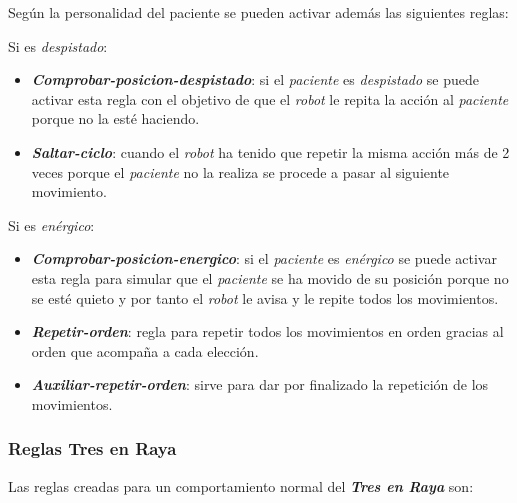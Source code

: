 \documentclass{uc3mpracticas}
\begin{document}
  Según la personalidad del paciente se pueden activar además las siguientes reglas:

  \vspace{2mm}

  Si es \textit{despistado}:

  \begin{itemize}
    \item \textbf{\textit{Comprobar-posicion-despistado}}: si el \textit{paciente} es \textit{despistado} se puede activar esta regla con el objetivo de que el \textit{robot} le repita la acción al \textit{paciente} porque no la esté haciendo.
    \item \textbf{\textit{Saltar-ciclo}}: cuando el \textit{robot} ha tenido que repetir la misma acción más de 2 veces porque el \textit{paciente} no la realiza se procede a pasar al siguiente movimiento.
  \end{itemize}


  Si es \textit{enérgico}:

  \begin{itemize}
    \item \textbf{\textit{Comprobar-posicion-energico}}: si el \textit{paciente} es \textit{enérgico} se puede activar esta regla para simular que el \textit{paciente} se ha movido de su posición porque no se esté quieto y por tanto el \textit{robot} le avisa y le repite todos los movimientos.
    \item \textbf{\textit{Repetir-orden}}: regla para repetir todos los movimientos en orden gracias al orden que acompaña a cada elección.
    \item \textbf{\textit{Auxiliar-repetir-orden}}: sirve para dar por finalizado la repetición de los movimientos.
  \end{itemize}



  \subsubsection{Reglas Tres en Raya}

  Las reglas creadas para un comportamiento normal del \textit{\textbf{Tres en Raya}} son:
\end{document}
